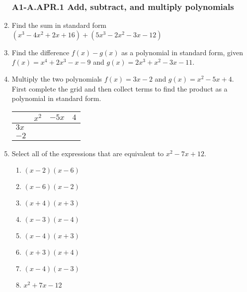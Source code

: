 \documentclass[12pt, twoside]{article}
\begin{document}
\begin{enumerate}
\newpage
\subsubsection*{A1-A.APR.1 Add, subtract, and multiply polynomials}

\item Find the sum in standard form $(x^3-4x^2+2x+16)+(5x^3-2x^2-3x-12)$ \vspace{2cm}

\item Find the difference $f(x)-g(x)$ as a polynomial in standard form, given \\[0.25cm]
    $f(x)=x^4+2x^3-x-9$ and $g(x)=2x^3+x^2-3x-11$. \vspace{4cm}

\item Multiply the two polynomials $f(x)=3x-2$ and $g(x)=x^2-5x+4$. First complete the grid and then collect terms to find the product as a polynomial in standard form. \\[0.25cm]
\begin{tabular}{|p{1cm}|p{3cm}|p{3cm}|p{3cm}|}
    \hline
     & $x^2$ & $-5x$ & $4$ \\
    \hline
    $3x$ &  & & \\[0.5cm]
    \hline
    $-2$ &  & & \\[0.5cm]
    \hline
\end{tabular} \vspace{4cm}

\item Select all of the expressions that are equivalent to $x^2-7x+12$.
    \begin{multicols}{2}
    \begin{enumerate}
        \item $(x-2)(x-6)$
        \item $(x-6)(x-2)$ 
        \item $(x+4)(x+3)$ 
        \item $(x-3)(x-4)$ 
        \item $(x-4)(x+3)$
        \item $(x+3)(x+4)$ 
        \item $(x-4)(x-3)$
        \item $x^2+7x-12$
    \end{enumerate} 
    \end{multicols}
    \vspace{0.25cm}


\end{enumerate}
\end{document}
